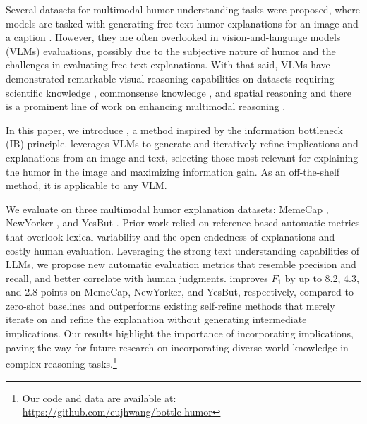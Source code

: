 Several datasets for multimodal humor understanding tasks were proposed, where models are tasked with generating free-text humor explanations for an image and a caption \cite{hwang-shwartz-2023-memecap, hessel-etal-2023-androids, nandy-etal-2024-yesbut}. However, they are often overlooked in vision-and-language models (VLMs) evaluations, possibly due to the subjective nature of humor and the challenges in evaluating free-text explanations. With that said, VLMs have demonstrated remarkable visual reasoning capabilities on datasets requiring scientific knowledge \cite{scienceqa}, commonsense knowledge \cite{okvqa}, and spatial reasoning \cite{Liu2022VisualSR} and there is a prominent line of work on enhancing multimodal reasoning \cite{zhang2024multimodal, MitraCCoT, kam-cot, hu2024visual}.

In this paper, we introduce \method{}, a method inspired by the information bottleneck (IB) principle. \method{} leverages VLMs to generate and iteratively refine implications and explanations from an image and text, selecting those most relevant for explaining the humor in the image and maximizing information gain.
As an off-the-shelf method, it is applicable to any VLM. 

We evaluate \method{} on three multimodal humor explanation datasets: MemeCap \cite{hwang-shwartz-2023-memecap}, NewYorker \cite{hessel-etal-2023-androids}, and YesBut \cite{nandy-etal-2024-yesbut}. Prior work relied on reference-based automatic metrics that overlook lexical variability and the open-endedness of explanations and costly human evaluation. Leveraging the strong text understanding capabilities of LLMs, we propose new automatic evaluation metrics that resemble precision and recall, and better correlate with human judgments. \method{} improves $F_1$ by up to 8.2, 4.3, and 2.8 points on MemeCap, NewYorker, and YesBut, respectively, compared to zero-shot baselines and outperforms existing self-refine methods that merely iterate on and refine the explanation without generating intermediate implications. Our results highlight the importance of incorporating implications, paving the way for future research on incorporating diverse world knowledge in complex reasoning tasks.\footnote{Our code and data are available at:\\ \url{https://github.com/eujhwang/bottle-humor}}



% 